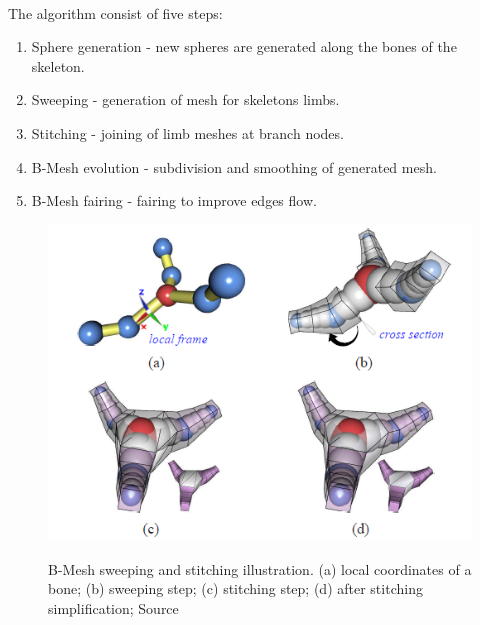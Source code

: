 \paragraph{}
The algorithm consist of five steps:
\begin{enumerate}
	\itemsep-0.25em 
	\item Sphere generation - new spheres are generated along the bones of the skeleton.
	\item Sweeping - generation of mesh for skeletons limbs.
	\item Stitching - joining of limb meshes at branch nodes.
	\item B-Mesh evolution - subdivision and smoothing of generated mesh.
	\item B-Mesh fairing - fairing to improve edges flow.
\end{enumerate}
\begin{figure}[h]
    \centering
    \includegraphics{images/b_mesh_ilu.png}
    \label{fig:b_mesh_stitch}
    \caption{B-Mesh sweeping and stitching illustration. (a) local coordinates of a bone; (b) sweeping step; (c) stitching step; (d) after stitching simplification; Source \cite{ji_bm}}
\end{figure}

